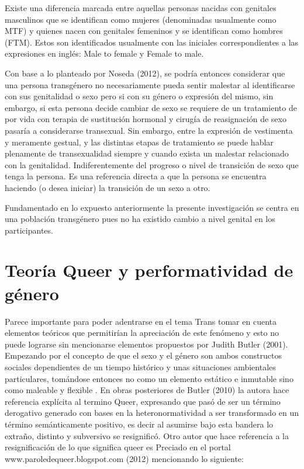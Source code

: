 Existe una diferencia marcada entre aquellas personas nacidas con genitales
masculinos que se identifican como mujeres (denominadas usualmente como MTF) y
quienes nacen con genitales femeninos y se identifican como hombres (FTM).
Estos son identificados usualmente con las iniciales correspondientes a las
expresiones en inglés: Male to female y Female to male.

Con base a lo planteado por Noseda (2012), se podría entonces considerar que una
persona transgénero no necesariamente pueda sentir malestar al identificarse con
sus genitalidad o sexo pero si con su género o expresión del mismo, sin embargo,
si esta persona decide cambiar de sexo se requiere de un tratamiento de por vida
con terapia de sustitución hormonal y cirugía de reasignación de sexo pasaría a
considerarse transexual.
Sin embargo, entre la expresión de vestimenta y meramente gestual, y las
distintas etapas de tratamiento se puede hablar plenamente de transexualidad
siempre y cuando exista un malestar relacionado con la genitalidad.
Indiferentemente del progreso o nivel de transición de sexo que tenga la
persona.
Es una referencia directa a que la persona se encuentra haciendo (o desea
iniciar) la transición de un sexo a otro.

Fundamentado en lo expuesto anteriormente la presente investigación se centra en
una población transgénero pues no ha existido cambio a nivel genital en los
participantes.

\section{Teoría Queer y performatividad de género}
Parece importante para poder adentrarse en el tema Trans tomar en cuenta
elementos teóricos que permitirían la apreciación de este fenómeno y esto no
puede lograrse sin mencionarse elementos propuestos por Judith Butler (2001).
Empezando por el concepto de que el sexo y el género son ambos constructos
sociales dependientes de un tiempo histórico y unas situaciones ambientales
particulares, tomándose entonces no como un elemento estático e inmutable sino
como maleable y flexible .
En obras posteriores de Butler (2010) la autora hace referencia explícita al
termino Queer, expresando que pasó de ser un término derogativo generado con
bases en la heteronormatividad a ser transformado en un término semánticamente
positivo, es decir al asumirse bajo esta bandera lo extraño, distinto y
subversivo se resignificó.
Otro autor que hace referencia a la resignificación de lo que significa queer es
Preciado en el portal www.paroledequeer.blogspot.com (2012) mencionando lo
siguiente:

